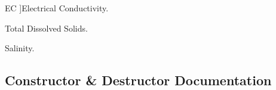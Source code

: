 \begin{Desc}
\begin{description}
{EC\hypertarget{class_loom___analog_a83079adfd115a272351323429cefad46a3fd6b696867d70225deda7868308679b}{}\label{class_loom___analog_a83079adfd115a272351323429cefad46a3fd6b696867d70225deda7868308679b}
}]Electrical Conductivity. \item[{\em 
T\+DS\hypertarget{class_loom___analog_a83079adfd115a272351323429cefad46a7a323371ef1444029ad6c74cd68809dd}{}\label{class_loom___analog_a83079adfd115a272351323429cefad46a7a323371ef1444029ad6c74cd68809dd}
}]Total Dissolved Solids. \item[{\em 
S\+A\+L\+I\+N\+I\+TY\hypertarget{class_loom___analog_a83079adfd115a272351323429cefad46a8ed43df473ba4db0ebe07e408199d5be}{}\label{class_loom___analog_a83079adfd115a272351323429cefad46a8ed43df473ba4db0ebe07e408199d5be}
}]Salinity. \end{description}
\end{Desc}


\subsection{Constructor \& Destructor Documentation}
